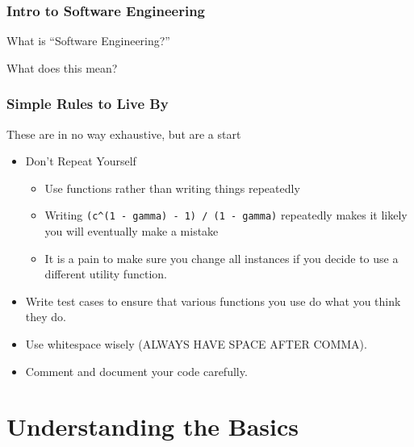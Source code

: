 \documentclass[10pt]{beamer}
\begin{document}
\begin{frame} \frametitle{Intro to Software Engineering}
  What is ``Software Engineering?''


  What does this mean?


\end{frame}

\begin{frame} \frametitle{Simple Rules to Live By}
  These are in no way exhaustive, but are a start
  \begin{itemize}
    \item Don't Repeat Yourself
    \begin{itemize}
      \item Use functions rather than writing things repeatedly
      \item Writing \lstinline{(c^(1 - gamma) - 1) / (1 - gamma)} repeatedly makes it likely you will eventually make a mistake
      \item It is a pain to make sure you change all instances if you decide to use a different utility function.
    \end{itemize}
    \item Write test cases to ensure that various functions you use do what you think they do.
    \item Use whitespace wisely (ALWAYS HAVE SPACE AFTER COMMA).
    \item Comment and document your code carefully.
  \end{itemize}
\end{frame}

\section{Understanding the Basics}
\end{document}

